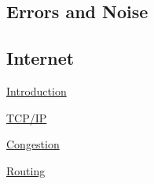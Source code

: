 \subsection{Errors and Noise}

\subsection{Internet}


\underline{Introduction}

\underline{TCP/IP}

\underline{Congestion}

\underline{Routing}

% 
% 
% 
% 
% 
